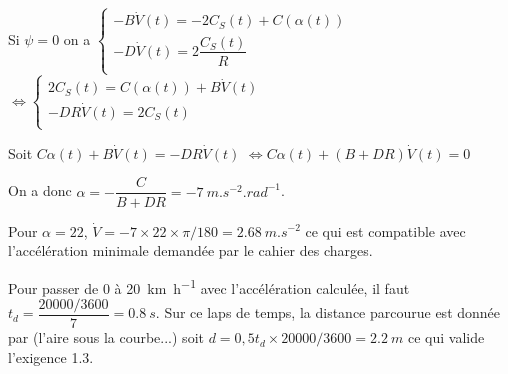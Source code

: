 \ifprof
\begin{corrige}
Si  $\psi=0$ on a 
$
\left\{
\begin{array}{l}
 - B \dot{V}(t) = - 2C_S(t)+C\left(\alpha(t) \right) \\
 - D \dot{V}(t) = 2\dfrac{C_S(t)}{R} \\\end{array}
\right.
$
$ \Leftrightarrow 
\left\{
\begin{array}{l}
   2C_S(t) = C\left(\alpha(t) \right) +B \dot{V}(t) \\
 - DR\dot{V}(t) = 2C_S(t) \\\end{array}
\right.
$

Soit $C\alpha(t)  +B \dot{V}(t)= - DR\dot{V}(t)$ 
$\Leftrightarrow C\alpha(t)  +\left(B + DR\right)\dot{V}(t)= 0$ 

On a donc $\alpha = - \dfrac{C}{B + DR} = -\SI{7}{m.s^{-2}.rad^{-1}}$.

\end{corrige}
\else
\fi

\ifprof
\begin{corrige}

Pour $\alpha = 22$, $\dot{V}=-7 \times 22 \times \pi /180 =\SI{2,68}{m.s^{-2}}$ ce qui est compatible avec l'accélération minimale demandée par le cahier des charges. 


Pour passer de 0 à \SI{20}{km.h^{-1}} avec l'accélération calculée, il faut $t_d = \dfrac{20 000/3600}{7}=\SI{0,8}{s}$. Sur ce laps de temps, la distance parcourue est donnée par (l'aire sous la courbe...) soit $d=0,5 t_d \times 20 000/3600 = \SI{2,2}{m}$ ce qui valide l'exigence 1.3.
\end{corrige}
\else
\fi

